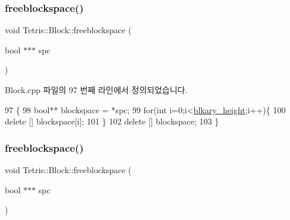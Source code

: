 \mbox{\label{class_tetris_1_1_block_aea78e0a1b229842f541a8e897e2e9340}} 
\subsubsection{\texorpdfstring{freeblockspace()}{freeblockspace()}\hspace{0.1cm}{\footnotesize\ttfamily [1/2]}}
{\footnotesize\ttfamily void Tetris\+::\+Block\+::freeblockspace (\begin{DoxyParamCaption}\item[{bool $\ast$$\ast$$\ast$}]{spc }\end{DoxyParamCaption})}



Block.\+cpp 파일의 97 번째 라인에서 정의되었습니다.


\begin{DoxyCode}
97                                      \{
98                 \textcolor{keywordtype}{bool}** blockspace = *spc;
99                 \textcolor{keywordflow}{for}(\textcolor{keywordtype}{int} i=0;i<\hyperlink{class_tetris_1_1_block_abbea7737c2b1fb7339aab4dff13de27c}{blkary\_height};i++)\{
100                     \textcolor{keyword}{delete} [] blockspace[i];
101                 \}
102                 \textcolor{keyword}{delete} [] blockspace;
103             \}
\end{DoxyCode}
\mbox{\label{class_tetris_1_1_block_aea78e0a1b229842f541a8e897e2e9340}} 
\subsubsection{\texorpdfstring{freeblockspace()}{freeblockspace()}\hspace{0.1cm}{\footnotesize\ttfamily [2/2]}}
{\footnotesize\ttfamily void Tetris\+::\+Block\+::freeblockspace (\begin{DoxyParamCaption}\item[{bool $\ast$$\ast$$\ast$}]{spc }\end{DoxyParamCaption})\hspace{0.3cm}{\ttfamily [inline]}}



